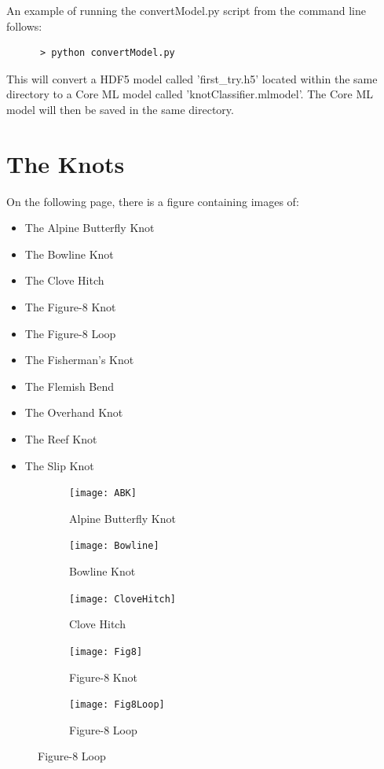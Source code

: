 \documentclass{l4proj}
\begin{document}
\begin{appendices}
An example of running the convertModel.py script from the command line follows:
\begin{verbatim}
      > python convertModel.py
\end{verbatim}
This will convert a HDF5 model called 'first\_try.h5' located within the same directory to a Core ML model called 'knotClassifier.mlmodel'. The Core ML model will then be saved in the same directory.

\chapter{The Knots}
\label{appendix:Knots}
On the following page, there is a figure containing images of:
\begin{itemize}
	\item The Alpine Butterfly Knot
	\item The Bowline Knot
	\item The Clove Hitch
	\item The Figure-8 Knot
	\item The Figure-8 Loop
	\item The Fisherman's Knot
	\item The Flemish Bend
	\item The Overhand Knot
	\item The Reef Knot
	\item The Slip Knot
\end{itemize}
\begin{figure}[h!]
\begin{subfigure}{.5\textwidth}
  \centering
  \texttt{[image: ABK]}
  \caption{Alpine Butterfly Knot}
  \label{fig:ABK}
\end{subfigure}%
\begin{subfigure}{.5\textwidth}
  \centering
  \texttt{[image: Bowline]}
  \caption{Bowline Knot}
  \label{fig:Bowline}
\end{subfigure}
\begin{subfigure}{.5\textwidth}
  \centering
  \texttt{[image: CloveHitch]}
  \caption{Clove Hitch}
  \label{fig:CloveHitch}
\end{subfigure}
\begin{subfigure}{.5\textwidth}
  \centering
  \texttt{[image: Fig8]}
  \caption{Figure-8 Knot}
  \label{fig:Fig8Knot}
\end{subfigure}
\begin{subfigure}{.5\textwidth}
  \centering
  \texttt{[image: Fig8Loop]}
  \caption{Figure-8 Loop}
  \label{fig:Fig8Loop}
\end{subfigure}

\end{figure}
\end{appendices}
\end{document}
